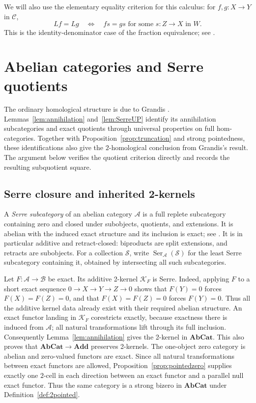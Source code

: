 \documentclass[11pt,reqno,a4paper]{amsart}
\theoremstyle{definition}
\theoremstyle{remark}
\newcommand{\A}{\mathcal{A}}
\newcommand{\C}{\mathcal{C}}
\newcommand{\0}{\mathbf{0}}
\renewcommand{\1}{\mathbf{1}}
\newcommand{\AbCat}{\mathbf{AbCat}}
\newcommand{\Add}{\mathbf{Add}}
\newcommand{\B}{\mathcal B}
\newcommand{\K}{\mathcal K}
\newcommand{\Scl}{\mathcal S}
\DeclareMathOperator{\Ser}{Ser}
\begin{document}
We will also use the elementary equality criterion for this calculus:
for $f,g:X\to Y$ in $\C$,
\begin{equation}\label{eq:localequality}
 Lf=Lg\quad\Longleftrightarrow\quad
 fs=gs\text{ for some }s:Z\to X\text{ in }W.
\end{equation}
This is the identity-denominator case of the fraction equivalence;
see \cite[Lemma 4.27.14]{StacksLoc}.





\section{Abelian categories and Serre quotients}\label{sec:abelian}

The ordinary homological structure is due to Grandis
\cite[Section~1.9, p.~146]{Grandis92}.
Lemmas~\ref{lem:annihilation} and~\ref{lem:SerreUP}
identify its annihilation subcategories and exact quotients
through universal properties on full hom-categories.
Together with Proposition~\ref{prop:truncation} and strong
pointedness, these identifications also give the
$2$-homological conclusion from Grandis's result.
The argument below verifies the quotient criterion directly
and records the resulting subquotient square.

\subsection{Serre closure and inherited 2-kernels}

A \emph{Serre subcategory} of an abelian category $\A$ is a full replete
subcategory containing zero and closed under subobjects, quotients,
and extensions. It is abelian with the induced exact structure and
its inclusion is exact; see \cite[Lemma 12.10.2]{StacksSerre}.
It is in particular additive and retract-closed: biproducts are split
extensions, and retracts are subobjects. For a collection $\Scl$,
write $\Ser_{\A}(\Scl)$ for the least Serre subcategory containing it,
obtained by intersecting all such subcategories.

Let $F:\A\to\B$ be exact. Its additive 2-kernel $\K_F$ is Serre.
Indeed, applying $F$ to a short exact sequence
$0\to X\to Y\to Z\to0$ shows that $F(Y)=0$ forces
$F(X)=F(Z)=0$, and that $F(X)=F(Z)=0$ forces $F(Y)=0$.
Thus all the additive kernel data already exist with their required
abelian structure. An exact functor landing in $\K_F$ corestricts
exactly, because exactness there is induced from $\A$; all natural
transformations lift through its full inclusion. Consequently
Lemma~\ref{lem:annihilation} gives the 2-kernel in $\AbCat$.
This also proves that $\AbCat\to\Add$ preserves 2-kernels.
The one-object zero category is abelian and zero-valued functors
are exact. Since all natural transformations between exact functors
are allowed, Proposition~\ref{prop:pointedzero} supplies exactly one
$2$-cell in each direction between an exact functor and a parallel
null exact functor. Thus the same category is a strong bizero in
$\AbCat$ under Definition~\ref{def:2pointed}.
\end{document}
